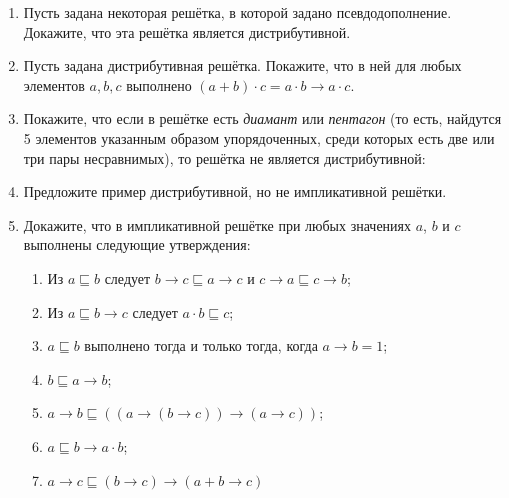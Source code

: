 \documentclass[10pt,a4paper,oneside]{article}
\begin{document}
\begin{enumerate}

\item Пусть задана некоторая решётка, в которой задано псевдодополнение.
Докажите, что эта решётка является дистрибутивной.

\item Пусть задана дистрибутивная решётка. Покажите, что в ней для любых элементов 
$a,b,c$ выполнено $(a+b)\cdot c = a\cdot b \rightarrow a \cdot c$.

\item Покажите, что если в решётке есть \emph{диамант} или \emph{пентагон}
(то есть, найдутся 5 элементов указанным образом упорядоченных, среди которых есть две или 
три пары несравнимых), то решётка не является дистрибутивной:
\begin{center}\end{center}

\item Предложите пример дистрибутивной, но не импликативной решётки.

\item Докажите, что в импликативной решётке при любых значениях $a$, $b$ и $c$ 
выполнены следующие утверждения:

\begin{enumerate}
\item Из $a \sqsubseteq b$ следует $b\to c \sqsubseteq a\to c$ и $c\to a \sqsubseteq c \to b$;
\item Из $a \sqsubseteq b \to c$ следует $a \cdot b \sqsubseteq c$;
\item $a \sqsubseteq b$ выполнено тогда и только тогда, когда $a \to b = 1$;
\item $b \sqsubseteq a \rightarrow b$;
\item $a \rightarrow b \sqsubseteq ((a \rightarrow (b \rightarrow c)) \rightarrow (a \rightarrow c))$;
\item $a \sqsubseteq b \rightarrow a \cdot b$;
\item $a \rightarrow c \sqsubseteq (b \rightarrow c) \rightarrow (a + b \rightarrow c)$
\end{enumerate}


\end{enumerate}
\end{document}
